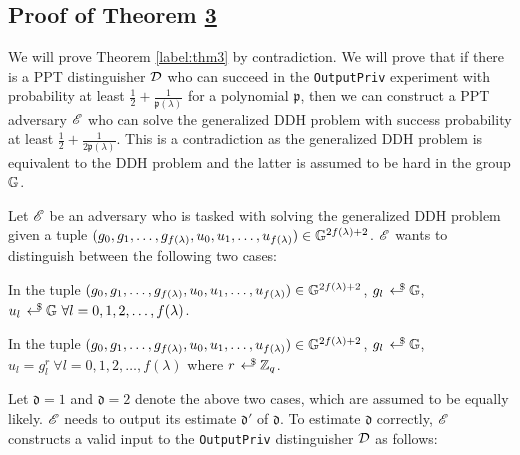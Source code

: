   
  \subsection{Proof of Theorem \hyperref[label:thm3]{3}}
  \label{scnProofTheorem3}
  We will prove Theorem \ref{label:thm3} by contradiction. We will prove that if there is a \textsf{PPT} distinguisher $\mathcal{D}$ who can succeed in the \texttt{OutputPriv} experiment with probability at least $\frac{1}{2} + \frac{1}{\mathfrak{p}(\lambda)}$ for a polynomial $\mathfrak{p}$, then we can construct a \textsf{PPT} adversary $\mathscr{E}$ who can solve the generalized DDH problem \cite{Bao2003} with success probability at least $\frac{1}{2}+\frac{1}{2\mathfrak{p}(\lambda)}$. This is a contradiction as the generalized DDH problem is equivalent to the DDH problem and the latter is assumed to be hard in the group $\mathbb{G}$.
  
  Let $\mathscr{E}$ be an adversary who is tasked with solving the generalized DDH problem given a tuple $(g_0,g_1, \dots, g_{f(\lambda)}, u_0,u_1, \dots, u_{f(\lambda)}) \in \mathbb{G}^{2f(\lambda)+2}$. $\mathscr{E}$ wants to distinguish between the following two cases:
  
  \pointsStart
  \item In the tuple $(g_0,g_1, \dots, g_{f(\lambda)}, u_0,u_1, \dots, u_{f(\lambda)}) \in \mathbb{G}^{2f(\lambda)+2}$, $g_l \rgen \G$, $u_l \rgen \G \ \forall l=0,1,2,\dots, f(\lambda)$.
  \item In the tuple $(g_0,g_1, \dots, g_{f(\lambda)}, u_0,u_1, \dots, u_{f(\lambda)})\in \mathbb{G}^{2f(\lambda)+2}$, $g_l \rgen \G$, $u_l = g_l^{r} \ \forall l=0,1,2,\dots, f(\lambda)$ where $r \rgen \Z_q$.
  \pointsEnd
  
  Let $\mathfrak{d}=1$ and $\mathfrak{d}=2$ denote the above two cases, which are assumed to be equally likely. $\mathscr{E}$ needs to output its estimate $\mathfrak{d}'$ of $\mathfrak{d}$. To estimate $\mathfrak{d}$ correctly, $\mathscr{E}$ constructs a valid input to the \texttt{OutputPriv} distinguisher $\mathcal{D}$ as follows:
  
